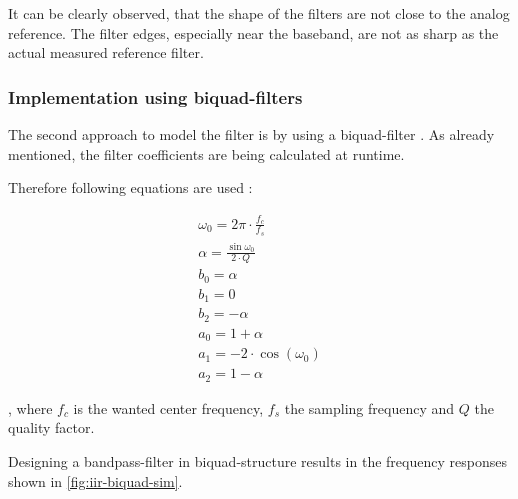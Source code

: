 It can be clearly observed, that the shape of the filters are not close to the analog reference.
The filter edges, especially near the baseband, are not as sharp as the actual measured reference filter.

\clearpage

\subsubsection{Implementation using biquad-filters}

The second approach to model the filter is by using a biquad-filter \cite{arm_dsp}.
As already mentioned, the filter coefficients are being calculated at runtime.

Therefore following equations are used \cite{cookbook_audio}:

\begin{align}
    \omega_0 = 2 \pi \cdot \frac{f_c}{f_s}\\
    \alpha = \frac{\sin{\omega_0}}{2 \cdot Q}\\
    b_0 = \alpha\\
    b_1 = 0\\
    b_2 = -\alpha\\
    a_0 = 1 + \alpha\\
    a_1 = -2 \cdot \cos(\omega_0)\\
    a_2 = 1 - \alpha
\end{align}

, where $f_c$ is the wanted center frequency, $f_s$ the sampling frequency and $Q$ the quality factor.

Designing a bandpass-filter in biquad-structure results in the frequency responses shown in \autoref{fig:iir-biquad-sim}.

